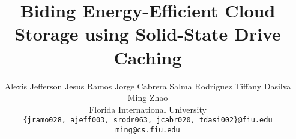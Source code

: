 \documentclass[letterpaper,twocolumn,10pt]{article}
\title{\Large \bf Biding Energy-Efficient Cloud Storage using Solid-State Drive
  Caching}
\author{
  \qquad
  {\rm Alexis Jefferson}
  \qquad
  {\rm Jesus Ramos}
  \qquad
  {\rm Jorge Cabrera}
  \qquad
  {\rm Salma Rodriguez}
  \qquad
  {\rm Tiffany Dasilva}
  \\
  \qquad
  {\rm Ming Zhao}
  \\
  Florida International University
  \\
  {\rm \texttt{\{jramo028, ajeff003, srodr063, jcabr020, tdasi002\}@fiu.edu}}
  \\
  {\rm \texttt{ming@cs.fiu.edu}}
}
\date{}
\begin{document}
\maketitle












{
  \footnotesize
  
  
}
\end{document}

